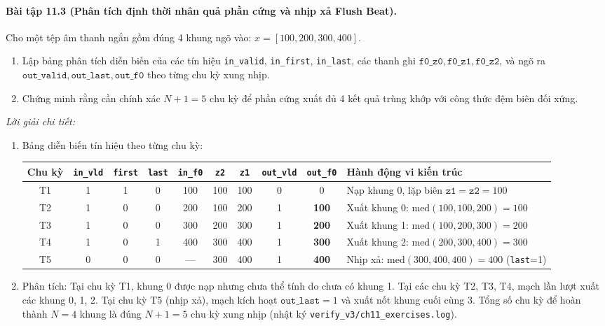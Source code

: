 \paragraph{Bài tập 11.3 (Phân tích định thời nhân quả phần cứng và nhịp xả Flush Beat).}
Cho một tệp âm thanh ngắn gồm đúng 4 khung ngõ vào: $x = [100, 200, 300, 400]$.
\begin{enumerate}[label=(\alph*)]
    \item Lập bảng phân tích diễn biến của các tín hiệu \texttt{in\_valid}, \texttt{in\_first}, \texttt{in\_last}, các thanh ghi $\texttt{f0\_z0}, \texttt{f0\_z1}, \texttt{f0\_z2}$, và ngõ ra $\texttt{out\_valid}, \texttt{out\_last}, \texttt{out\_f0}$ theo từng chu kỳ xung nhịp.
    \item Chứng minh rằng cần chính xác $N + 1 = 5\text{ chu kỳ}$ để phần cứng xuất đủ 4 kết quả trùng khớp với công thức đệm biên đối xứng.
\end{enumerate}

\textit{Lời giải chi tiết:}
\begin{enumerate}[label=(\alph*)]
    \item Bảng diễn biến tín hiệu theo từng chu kỳ:
    \begin{table}[H]
    \centering
    \footnotesize
    \setlength{\tabcolsep}{2.5pt}
    \begin{tabular}{cccccccccp{4.8cm}}
    \toprule
    \textbf{Chu kỳ} & \texttt{in\_vld} & \texttt{first} & \texttt{last} & \texttt{in\_f0} & \texttt{z2} & \texttt{z1} & \texttt{out\_vld} & \texttt{out\_f0} & \textbf{Hành động vi kiến trúc} \\
    \midrule
    T1 & 1 & 1 & 0 & 100 & 100 & 100 & 0 & 0 & Nạp khung 0, lặp biên $\texttt{z1}=\texttt{z2}=100$ \\
    T2 & 1 & 0 & 0 & 200 & 100 & 200 & 1 & \textbf{100} & Xuất khung 0: $\text{med}(100, 100, 200) = 100$ \\
    T3 & 1 & 0 & 0 & 300 & 200 & 300 & 1 & \textbf{200} & Xuất khung 1: $\text{med}(100, 200, 300) = 200$ \\
    T4 & 1 & 0 & 1 & 400 & 300 & 400 & 1 & \textbf{300} & Xuất khung 2: $\text{med}(200, 300, 400) = 300$ \\
    T5 & 0 & 0 & 0 & --- & 300 & 400 & 1 & \textbf{400} & Nhịp xả: $\text{med}(300, 400, 400) = 400$ (\texttt{last}=1) \\
    \bottomrule
    \end{tabular}
    \end{table}
    \item Phân tích: Tại chu kỳ T1, khung 0 được nạp nhưng chưa thể tính do chưa có khung 1. Tại các chu kỳ T2, T3, T4, mạch lần lượt xuất các khung 0, 1, 2. Tại chu kỳ T5 (nhịp xả), mạch kích hoạt $\texttt{out\_last}=1$ và xuất nốt khung cuối cùng 3. Tổng số chu kỳ để hoàn thành $N=4$ khung là đúng $N+1 = 5\text{ chu kỳ xung nhịp}$ (nhật ký \texttt{verify\_v3/ch11\_exercises.log}).
\end{enumerate}

